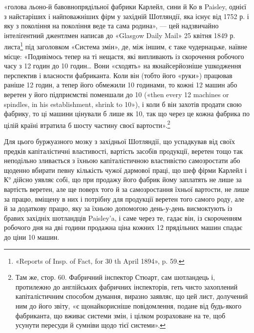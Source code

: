 \parcont{}  %
«голова льоно-й бавовнопрядільної фабрики Карлейл, сини й
Ко в Paisley, однієї з найстаріших і найповажніших фірм у західній
Шотляндії, яка існує від 1752 р. і яку з покоління на покоління
веде та сама родина», — цей надзвичайно інтеліґентний
джентлмен написав до «Glasgow Daily Mail» 25 квітня 1849 р.
листа\footnote{
«Reports of Insp. of Fact, for 30 th April 1894», p. 59.
} під заголовком «Система змін», де, між іншим, є таке
чудернацьке, наївне місце: «Подивімось тепер на ті нещастя,
які випливають із скорочення робочого часу з 12 годин до 10 годин\dots{}
Вони «сходять» на якнайсерйозніше ушкодження перспектив
і власности фабриканта. Коли він (тобто його «руки») працював
раніше 12 годин, а тепер його обмежили 10 годинами, то кожні
12 машин або веретен у його підприємстві поменшали до 10 («then
every 12 machines or spindles, in his establishment, shrink to 10»),
і коли б він захотів продати свою фабрику, то ці машини цінували
б лише як 10, так що через це кожна фабрика по цілій країні
втратила б шосту частину своєї вартости».\footnote{
Там же, стор. 60. Фабричний інспектор Стюарт, сам шотландець і,
протилежно до англійських фабричних інспекторів, геть чисто захоплений
капіталістичним способом думання, виразно заявляє, що цей лист,
долучений ним до його звіту, «є щонайкорисніше повідомлення, подане від
будь-якого фабриканта, що вживає системи змін, і цілком розраховане
на те, щоб усунути пересуди й сумніви щодо тієї системи».
}

Для цього буржуазного мозку з західньої Шотляндії, що
успадкував від своїх предків капіталістичні властивості, вартість
засобів продукції, веретен тощо так неподільно зливається з
їхньою капіталістичною властивістю самозростати або щоденно вбирати
певну кількість чужої дармової праці, що шеф фірми Карлейл
і К° дійсно уявляє собі, що при продажу його фабрик йому
заплатять не лише за вартість веретен, але ще поверх того й за
самозростання їхньої вартости, не лише за працю, вміщену в них
і потрібну для продукції веретен того самого роду, але й за додаткову
працю, яку за їхньою допомогою день-у-день висмоктують
із бравих західніх шотландців Paisley’a, і саме через те,
гадає він, із скороченням робочого дня на дві години продажна
ціна кожних 12 прядільних машин спадає до ціни 10 машин.
